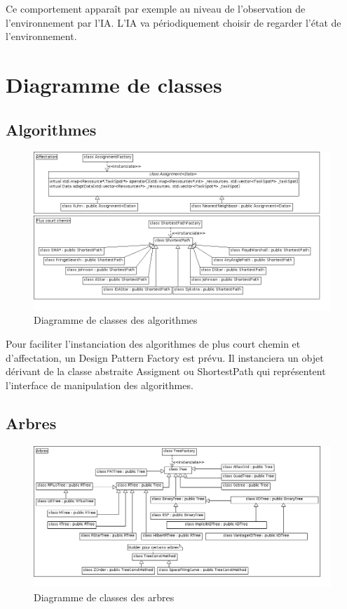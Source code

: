 Ce comportement apparaît par exemple au niveau de l'observation de l'environnement par l'IA. L'IA va périodiquement choisir de regarder l'état de l'environnement.

\newpage
\section{Diagramme de classes}
\subsection{Algorithmes}
\begin{figure}[!h]\centering
   \includegraphics[scale=0.5]{images/c_algo.png}
   \caption{\label{c_algo} Diagramme de classes des algorithmes}
\end{figure}
Pour faciliter l'instanciation des algorithmes de plus court chemin et d'affectation, un Design Pattern Factory est prévu. Il instanciera un objet dérivant de la classe abstraite Assigment ou ShortestPath qui représentent l'interface de manipulation des algorithmes.

\newpage
\subsection{Arbres}
\begin{figure}[!h]\centering %
   \includegraphics[scale=0.5]{images/c_arbres.png}
   \caption{\label{c_arbre} Diagramme de classes des arbres}
\end{figure}

